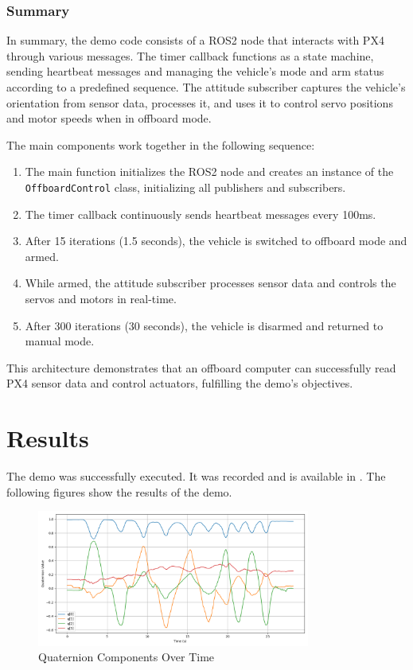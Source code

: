 \documentclass[a4paper]{article}
\begin{document}


\subsubsection{Summary}

In summary, the demo code consists of a ROS2 node that interacts with PX4 through various messages. The timer callback functions as a state machine, sending heartbeat messages and managing the vehicle's mode and arm status according to a predefined sequence. The attitude subscriber captures the vehicle's orientation from sensor data, processes it, and uses it to control servo positions and motor speeds when in offboard mode.

The main components work together in the following sequence:

\begin{enumerate}
    \item The main function initializes the ROS2 node and creates an instance of the \verb|OffboardControl| class, initializing all publishers and subscribers. 
    \item The timer callback continuously sends heartbeat messages every 100ms. 
    \item After 15 iterations (1.5 seconds), the vehicle is switched to offboard mode and armed. 
    \item While armed, the attitude subscriber processes sensor data and controls the servos and motors in real-time. 
    \item After 300 iterations (30 seconds), the vehicle is disarmed and returned to manual mode. 
\end{enumerate}

This architecture demonstrates that an offboard computer can successfully read PX4 sensor data and control actuators, fulfilling the demo's objectives.

\clearpage
\section{Results}

The demo was successfully executed. It was recorded and is available in .
The following figures show the results of the demo. 

\begin{figure}[H]
    \centering
    \includegraphics[width=0.8\textwidth]{imgs/demo_quaternion.png}
    \caption{Quaternion Components Over Time}
    \label{fig:demo_quaternion}
\end{figure}
\end{document}
